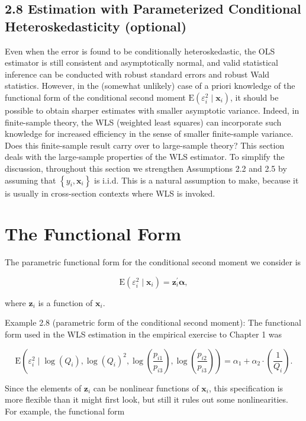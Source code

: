 \documentclass[10pt]{article}
\begin{document}
\subsection*{2.8 Estimation with Parameterized Conditional Heteroskedasticity (optional)}
Even when the error is found to be conditionally heteroskedastic, the OLS estimator is still consistent and asymptotically normal, and valid statistical inference can be conducted with robust standard errors and robust Wald statistics. However, in the (somewhat unlikely) case of a priori knowledge of the functional form of the conditional second moment $\mathrm{E}\left(\varepsilon_{i}^{2} \mid \mathbf{x}_{i}\right)$, it should be possible to obtain sharper estimates with smaller asymptotic variance. Indeed, in finite-sample theory, the WLS (weighted least squares) can incorporate such knowledge for increased efficiency in the sense of smaller finite-sample variance. Does this finite-sample result carry over to large-sample theory? This section deals with the large-sample properties of the WLS estimator. To simplify the discussion, throughout this section we strengthen Assumptions 2.2 and 2.5 by assuming that $\left\{y_{i}, \mathbf{x}_{i}\right\}$ is i.i.d. This is a natural assumption to make, because it is usually in cross-section contexts where WLS is invoked.

\section*{The Functional Form}
The parametric functional form for the conditional second moment we consider is


\begin{equation*}
\mathrm{E}\left(\varepsilon_{i}^{2} \mid \mathbf{x}_{i}\right)=\mathbf{z}_{i}^{\prime} \boldsymbol{\alpha}, \tag{2.8.1}
\end{equation*}


where $\mathbf{z}_{i}$ is a function of $\mathbf{x}_{i}$.

Example 2.8 (parametric form of the conditional second moment): The functional form used in the WLS estimation in the empirical exercise to Chapter 1 was

$$
\mathrm{E}\left(\varepsilon_{i}^{2} \mid \log \left(Q_{i}\right), \log \left(Q_{i}\right)^{2}, \log \left(\frac{p_{i 1}}{p_{i 3}}\right), \log \left(\frac{p_{i 2}}{p_{i 3}}\right)\right)=\alpha_{1}+\alpha_{2} \cdot\left(\frac{1}{Q_{i}}\right) .
$$

Since the elements of $\mathbf{z}_{i}$ can be nonlinear functions of $\mathbf{x}_{i}$, this specification is more flexible than it might first look, but still it rules out some nonlinearities. For example, the functional form
\end{document}
